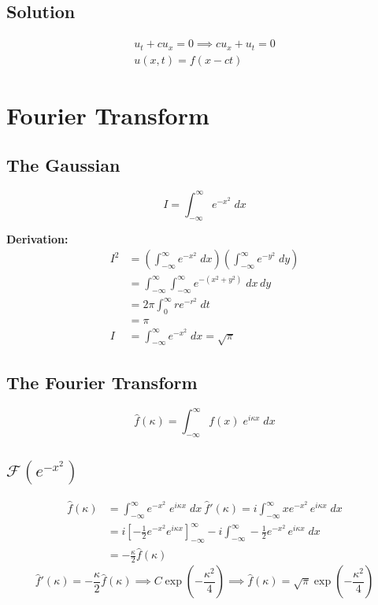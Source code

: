 \documentclass[10pt]{article}
\renewcommand{\hat}[1]{\widehat{#1}}
\newcommand{\F}{\mathcal{F}}
\begin{document}
\subsection{Solution}
\begin{gather}
    u_t + cu_x = 0 \implies cu_x + u_t = 0\\
    u(x, t) = f(x - ct) 
\end{gather}

\section{Fourier Transform}
\subsection{The Gaussian}
\[I = \int_{-\infty}^{\infty} e^{-x^2}\; dx\]

\textbf{Derivation:}
\begin{align*}
    I^2 &= \left(\int_{-\infty}^{\infty} e^{-x^2}\; dx\right)\left(\int_{-\infty}^{\infty} e^{-y^2}\; dy\right)\\
    &= \int_{-\infty}^{\infty} \int_{-\infty}^{\infty} e^{-(x^2 + y^2)}\; dx \, dy\\
    &= 2\pi \int_0^\infty re^{-r^2}\; dt\\
    &= \pi\\
    I &= \int_{-\infty}^{\infty} e^{-x^2}\; dx = \sqrt{\pi}
\end{align*}

\subsection{The Fourier Transform}
\[\hat{f}(\kappa) = \int_{-\infty}^{\infty} f(x)\; e^{i\kappa x}\; dx\]

\subsection{$\F(e^{-x^2})$}
\begin{align*}
    \hat{f}(\kappa) &= \int_{-\infty}^{\infty} e^{-x^2}\; e^{i\kappa x}\; dx\
    \hat{f}'(\kappa) = i \int_{-\infty}^{\infty} xe^{-x^2}\, e^{i\kappa x}\; dx\\
    &= i\left[-\frac{1}{2}e^{-x^2}e^{i\kappa x}\right]_{-\infty}^\infty - i \int_{-\infty}^{\infty} -\frac{1}{2}e^{-x^2}\, e^{i\kappa x}\; dx\\
    &= -\frac{\kappa}{2}\hat{f}(\kappa)
\end{align*}
\[\hat{f}'(\kappa) = -\frac{\kappa}{2}\hat{f}(\kappa) \implies C\exp(-\frac{\kappa^2}{4}) \implies \hat{f}(\kappa) = \sqrt{\pi} \exp(-\frac{\kappa^2}{4})\]
\end{document}

